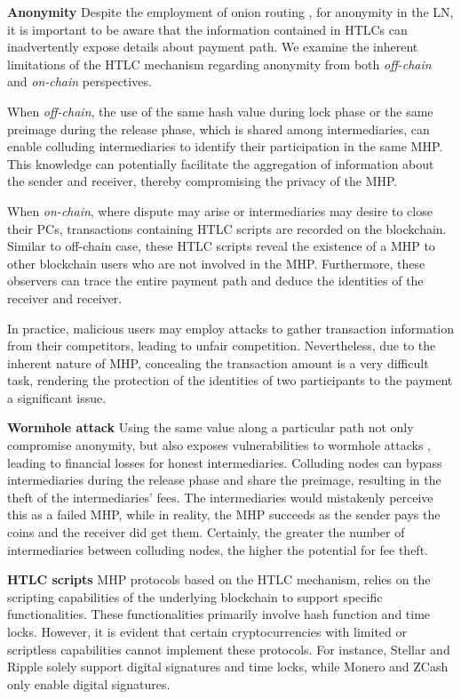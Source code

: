 \documentclass[conference]{IEEEtran}
\begin{document}
\textbf{Anonymity} Despite the employment of onion routing \cite{onion routing}, \cite{sphinx} for anonymity in 
the LN, it is important to be aware that the information contained in HTLCs can inadvertently expose details 
about payment path. We examine the inherent limitations of the HTLC mechanism regarding anonymity 
from both \textit{off-chain} and \textit{on-chain} perspectives. 

When \textit{off-chain}, the use of the same hash value during lock phase or the same preimage during the release phase, 
which is shared among intermediaries, can enable colluding intermediaries to identify their participation in the 
same MHP. This knowledge can potentially facilitate the aggregation of information about the sender and receiver, 
thereby compromising the privacy of the MHP. 

When \textit{on-chain}, where dispute may arise or intermediaries may desire to close their PCs, transactions 
containing HTLC scripts are recorded on the blockchain. Similar to off-chain case, these HTLC scripts reveal the 
existence of a MHP to other blockchain users who are not involved in the MHP. Furthermore, these observers can 
trace the entire payment path and deduce the identities of the receiver and receiver.

In practice, malicious users may employ attacks to gather transaction information from their competitors, leading to 
unfair competition. Nevertheless, due to the inherent nature of MHP, concealing the transaction amount is a very 
difficult task, rendering the protection of the identities of two participants to the payment a significant issue. 

\textbf{Wormhole attack} Using the same value along a particular path not only compromise anonymity, but also exposes 
vulnerabilities to wormhole attacks \cite{amhl}, leading to financial losses for honest intermediaries. Colluding nodes 
can bypass intermediaries during the release phase and share the preimage, resulting in the theft of the intermediaries' 
fees. The intermediaries would mistakenly perceive this as a failed MHP, while in reality, the MHP succeeds as the 
sender pays the coins and the receiver did get them. Certainly, the greater the number of intermediaries between colluding 
nodes, the higher the potential for fee theft.

\textbf{HTLC scripts} MHP protocols based on the HTLC mechanism, relies on the scripting capabilities of the underlying 
blockchain to support specific functionalities. These functionalities primarily involve hash function and time locks. 
However, it is evident that certain cryptocurrencies with limited or scriptless capabilities cannot implement these protocols. 
For instance, Stellar and Ripple solely support digital signatures and time locks, while Monero and ZCash only enable 
digital signatures. 
\end{document}
